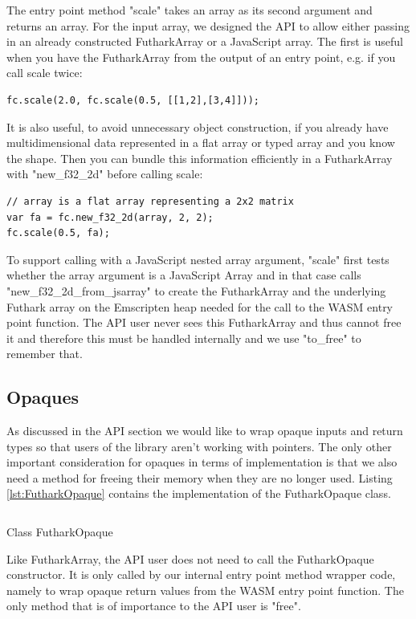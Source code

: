 \documentclass[11pt]{book}
\begin{document}
The entry point method "scale" takes an array as its second argument and returns an array. 
For the input array, we designed the API to allow either passing in an already constructed FutharkArray or a JavaScript array. The first is useful when you have the FutharkArray from the output of an entry point, e.g. if you call scale twice:
\begin{verbatim}
fc.scale(2.0, fc.scale(0.5, [[1,2],[3,4]]));
\end{verbatim}
It is also useful, to avoid unnecessary object construction, if you already have multidimensional data represented in a flat array or typed array and you know the shape. Then you can bundle this information efficiently in a FutharkArray with "new\_f32\_2d" before calling scale:
\begin{verbatim}
// array is a flat array representing a 2x2 matrix
var fa = fc.new_f32_2d(array, 2, 2);
fc.scale(0.5, fa);
\end{verbatim}
To support calling with a JavaScript nested array argument, "scale" first tests whether the array argument is a JavaScript Array and in that case calls "new\_f32\_2d\_from\_jsarray" to create the FutharkArray and the underlying Futhark array on the Emscripten heap needed for the call to the WASM entry point function. The API user never sees this FutharkArray and thus cannot free it and therefore this must be handled internally and we use "to\_free" to remember that.

\subsection{Opaques}

As discussed in the API section we would like to wrap opaque inputs and return types so that users of the library aren't working with pointers. The only other important consideration for opaques in terms of implementation is that we also need a method for freeing their memory when they are no longer used. Listing \ref{lst:FutharkOpaque} contains the implementation of the FutharkOpaque class.

\begin{listing}[H] 
        \inputminted[fontsize=\small,baselinestretch=0.5,linenos]{JavaScript}{code/compiler/api_examples/FutharkOpaque.js}
        \caption{Class FutharkOpaque}
        \label{lst:FutharkOpaque}    
\end{listing} 

Like FutharkArray, the API user does not need to call the FutharkOpaque constructor. It is only called by our internal entry point method wrapper code, namely to wrap opaque return values from the WASM entry point function. The only method that is of importance to the API user is "free". 
\end{document}
